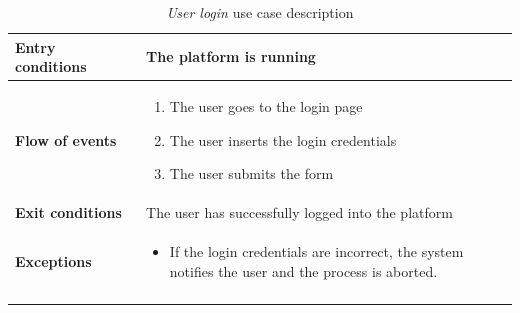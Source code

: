 \documentclass[10pt]{article}
\begin{document}
\begin{enumerate}[label=\textbf{UC\arabic*}]
\begin{longtable}{p{0.26\linewidth}p{0.75\linewidth}}
            \midrule
            \textbf{Entry conditions} & The platform is running \\
            \midrule
            \textbf{Flow of events} & 
            \begin{enumerate}
                \item The user goes to the login page
                \item The user inserts the login credentials
                \item The user submits the form
            \end{enumerate} \\
            \midrule
            \textbf{Exit conditions} & The user has successfully logged into the platform\\
            \midrule
            \textbf{Exceptions} & 
            \begin{itemize}
                \item If the login credentials are incorrect, the system notifies the user and the process is aborted.
            \end{itemize} \\
            \bottomrule
            \caption{\emph{User login} use case description}
        \end{longtable}
        

\end{enumerate}
\end{document}
